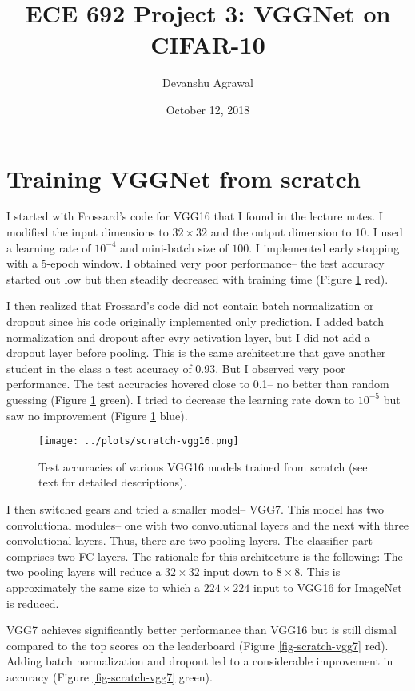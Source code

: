 \documentclass[11pt]{article}
\title{ECE 692 Project 3: VGGNet on CIFAR-10}
\author{Devanshu Agrawal}
\date{October 12, 2018}
\begin{document}
\maketitle

\section{Training VGGNet from scratch}

I started with Frossard's code for VGG16 that I found in the lecture notes. I modified the input dimensions to $32\times 32$ and the output dimension to $10$. I used a learning rate of $10^{-4}$ and mini-batch size of $100$. I implemented early stopping with a 5-epoch window. I obtained very poor performance-- the test accuracy started out low but then steadily decreased with training time (Figure \ref{fig-scratch-vgg16} red).

I then realized that Frossard's code did not contain batch normalization or dropout since his code originally implemented only prediction. I added batch normalization and dropout after evry activation layer, but I did not add a dropout layer before pooling. This is the same architecture that gave another student in the class a test accuracy of 0.93. But I observed very poor performance. The test accuracies hovered close to 0.1-- no better than random guessing (Figure \ref{fig-scratch-vgg16} green). I tried to decrease the learning rate down to $10^{-5}$ but saw no improvement (Figure \ref{fig-scratch-vgg16} blue).

\begin{figure}
\centering
\texttt{[image: ../plots/scratch-vgg16.png]}
\caption{\label{fig-scratch-vgg16} Test accuracies of various VGG16 models trained from scratch (see text for detailed descriptions).}
\end{figure}

I then switched gears and tried a smaller model-- VGG7. This model has two convolutional modules-- one with two convolutional layers and the next with three convolutional layers. Thus, there are two pooling layers. The classifier part comprises two FC layers. The rationale for this architecture is the following: The two pooling layers will reduce a $32\times 32$ input down to $8\times 8$. This is approximately the same size to which a $224\times 224$ input to VGG16 for ImageNet is reduced.

VGG7 achieves significantly better performance than VGG16 but is still dismal compared to the top scores on the leaderboard (Figure \ref{fig-scratch-vgg7} red). Adding batch normalization and dropout led to a considerable improvement in accuracy (Figure \ref{fig-scratch-vgg7} green).
\end{document}
